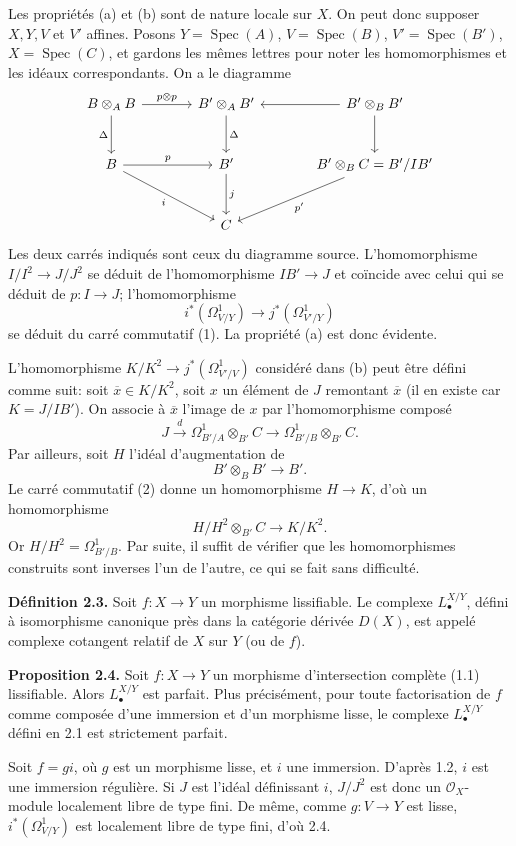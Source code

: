 \documentclass[11pt]{article}
\newcommand{\Spec}{\operatorname{Spec}}
\begin{document}
Les propriétés (a) et (b) sont de nature locale sur $X$. On peut donc supposer $X,Y,V$ et $V'$ affines. Posons $Y=\Spec(A)$, $V=\Spec(B)$, $V'=\Spec(B')$, $X=\Spec(C)$, et gardons les mêmes lettres pour noter les homomorphismes et les idéaux correspondants. On a le diagramme
\[
\begin{tikzcd}[column sep=large,row sep=large]
B\otimes_A B \arrow[r,"p\otimes p"] \arrow[d,"\Delta"'] & B'\otimes_A B' \arrow[d,"\Delta"] & B'\otimes_B B' \arrow[l] \arrow[d]\\
B \arrow[r,"p"] \arrow[dr,"i"'] & B' \arrow[d,"j"] & B'\otimes_B C = B'/IB' \arrow[dl,"p'" ]\\
{} & C & {}
\end{tikzcd}
\]
Les deux carrés indiqués sont ceux du diagramme source.
L'homomorphisme $I/I^2\to J/J^2$ se déduit de l'homomorphisme $IB'\to J$ et coïncide avec celui qui se déduit de $p:I\to J$; l'homomorphisme
\[
i^*(\Omega^1_{V/Y})\longrightarrow j^*(\Omega^1_{V'/Y})
\]
se déduit du carré commutatif (1). La propriété (a) est donc évidente.

L'homomorphisme $K/K^2\to j^*(\Omega^1_{V'/V})$ considéré dans (b) peut être défini comme suit: soit $\overline x\in K/K^2$, soit $x$ un élément de $J$ remontant $\overline x$ (il en existe car $K=J/IB'$). On associe à $\overline x$ l'image de $x$ par l'homomorphisme composé
\[
J\xrightarrow{d}\Omega^1_{B'/A}\otimes_{B'}C
\longrightarrow\Omega^1_{B'/B}\otimes_{B'}C.
\]
Par ailleurs, soit $H$ l'idéal d'augmentation de
\[
B'\otimes_B B'\longrightarrow B'.
\]
Le carré commutatif (2) donne un homomorphisme $H\to K$, d'où un homomorphisme
\[
H/H^2\otimes_{B'}C\longrightarrow K/K^2.
\]
Or $H/H^2=\Omega^1_{B'/B}$. Par suite, il suffit de vérifier que les homomorphismes construits sont inverses l'un de l'autre, ce qui se fait sans difficulté.

\textbf{Définition 2.3.} Soit $f:X\to Y$ un morphisme lissifiable. Le complexe $L^{X/Y}_\bullet$, défini à isomorphisme canonique près dans la catégorie dérivée $D(X)$, est appelé complexe cotangent relatif de $X$ sur $Y$ (ou de $f$).

\textbf{Proposition 2.4.} Soit $f:X\to Y$ un morphisme d'intersection complète (1.1) lissifiable. Alors $L^{X/Y}_\bullet$ est parfait. Plus précisément, pour toute factorisation de $f$ comme composée d'une immersion et d'un morphisme lisse, le complexe $L^{X/Y}_\bullet$ défini en 2.1 est strictement parfait.

Soit $f=gi$, où $g$ est un morphisme lisse, et $i$ une immersion. D'après 1.2, $i$ est une immersion régulière. Si $J$ est l'idéal définissant $i$, $J/J^2$ est donc un $\mathcal O_X$-module localement libre de type fini. De même, comme $g:V\to Y$ est lisse, $i^*(\Omega^1_{V/Y})$ est localement libre de type fini, d'où 2.4.
\end{document}
